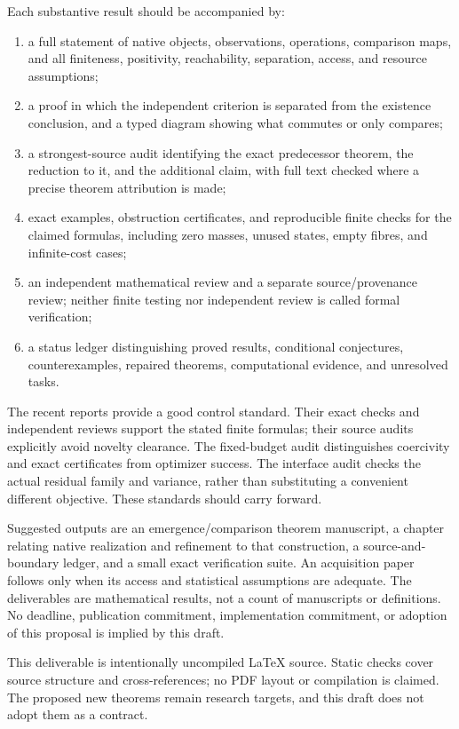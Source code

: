 \documentclass[11pt]{article}
\theoremstyle{remark}
\begin{document}
Each substantive result should be accompanied by:
\begin{enumerate}
\item a full statement of native objects, observations, operations, comparison maps, and all finiteness, positivity, reachability, separation, access, and resource assumptions;
\item a proof in which the independent criterion is separated from the existence conclusion, and a typed diagram showing what commutes or only compares;
\item a strongest-source audit identifying the exact predecessor theorem, the reduction to it, and the additional claim, with full text checked where a precise theorem attribution is made;
\item exact examples, obstruction certificates, and reproducible finite checks for the claimed formulas, including zero masses, unused states, empty fibres, and infinite-cost cases;
\item an independent mathematical review and a separate source/provenance review; neither finite testing nor independent review is called formal verification;
\item a status ledger distinguishing proved results, conditional conjectures, counterexamples, repaired theorems, computational evidence, and unresolved tasks.
\end{enumerate}

The recent reports provide a good control standard. Their exact checks and independent reviews support the stated finite formulas; their source audits explicitly avoid novelty clearance. The fixed-budget audit distinguishes coercivity and exact certificates from optimizer success. The interface audit checks the actual residual family and variance, rather than substituting a convenient different objective. These standards should carry forward.

Suggested outputs are an emergence/comparison theorem manuscript, a chapter relating native realization and refinement to that construction, a source-and-boundary ledger, and a small exact verification suite. An acquisition paper follows only when its access and statistical assumptions are adequate. The deliverables are mathematical results, not a count of manuscripts or definitions. No deadline, publication commitment, implementation commitment, or adoption of this proposal is implied by this draft.

This deliverable is intentionally uncompiled \LaTeX{} source. Static checks cover source structure and cross-references; no PDF layout or compilation is claimed. The proposed new theorems remain research targets, and this draft does not adopt them as a contract.
\end{document}
